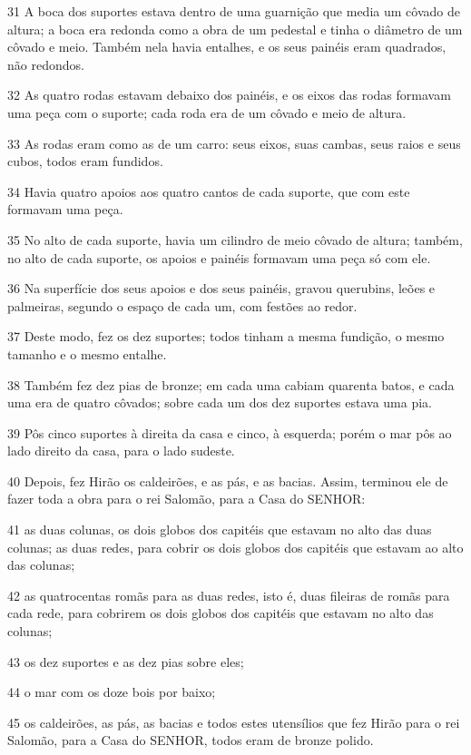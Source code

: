 \par 31 A boca dos suportes estava dentro de uma guarnição que media um côvado de altura; a boca era redonda como a obra de um pedestal e tinha o diâmetro de um côvado e meio. Também nela havia entalhes, e os seus painéis eram quadrados, não redondos.
\par 32 As quatro rodas estavam debaixo dos painéis, e os eixos das rodas formavam uma peça com o suporte; cada roda era de um côvado e meio de altura.
\par 33 As rodas eram como as de um carro: seus eixos, suas cambas, seus raios e seus cubos, todos eram fundidos.
\par 34 Havia quatro apoios aos quatro cantos de cada suporte, que com este formavam uma peça.
\par 35 No alto de cada suporte, havia um cilindro de meio côvado de altura; também, no alto de cada suporte, os apoios e painéis formavam uma peça só com ele.
\par 36 Na superfície dos seus apoios e dos seus painéis, gravou querubins, leões e palmeiras, segundo o espaço de cada um, com festões ao redor.
\par 37 Deste modo, fez os dez suportes; todos tinham a mesma fundição, o mesmo tamanho e o mesmo entalhe.
\par 38 Também fez dez pias de bronze; em cada uma cabiam quarenta batos, e cada uma era de quatro côvados; sobre cada um dos dez suportes estava uma pia.
\par 39 Pôs cinco suportes à direita da casa e cinco, à esquerda; porém o mar pôs ao lado direito da casa, para o lado sudeste.
\par 40 Depois, fez Hirão os caldeirões, e as pás, e as bacias. Assim, terminou ele de fazer toda a obra para o rei Salomão, para a Casa do SENHOR:
\par 41 as duas colunas, os dois globos dos capitéis que estavam no alto das duas colunas; as duas redes, para cobrir os dois globos dos capitéis que estavam ao alto das colunas;
\par 42 as quatrocentas romãs para as duas redes, isto é, duas fileiras de romãs para cada rede, para cobrirem os dois globos dos capitéis que estavam no alto das colunas;
\par 43 os dez suportes e as dez pias sobre eles;
\par 44 o mar com os doze bois por baixo;
\par 45 os caldeirões, as pás, as bacias e todos estes utensílios que fez Hirão para o rei Salomão, para a Casa do SENHOR, todos eram de bronze polido.
